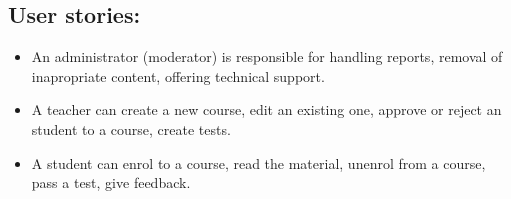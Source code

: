 \documentclass[12pt,a4paper,titlepage]{article}
\begin{document}
\subsection* {User stories:}
\begin{itemize}
	\item
	An administrator (moderator) is responsible for handling reports, removal of inapropriate content, offering technical support.
	\item 
	A teacher can create a new course, edit an existing one, approve or reject an student to a course, create tests.
	\item
	A student can enrol to a course, read the material, unenrol from a course, pass a test, give feedback.
\end{itemize}

\
\clearpage
\cleardoublepage
\end{document}

